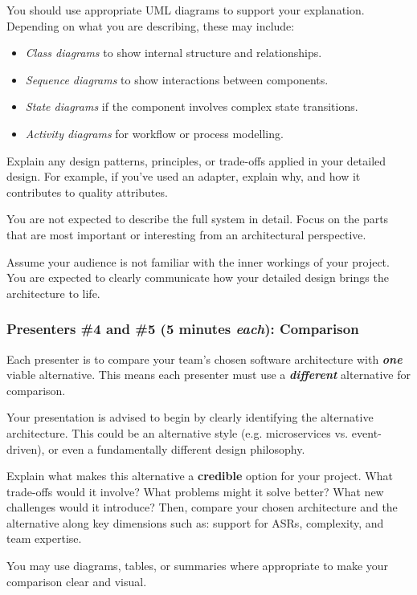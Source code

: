 \documentclass{csse4400}
\begin{document}
You should use appropriate UML diagrams to support your explanation.
Depending on what you are describing, these may include:

\begin{itemize}
    \item \emph{Class diagrams} to show internal structure and relationships.
    \item \emph{Sequence diagrams} to show interactions between components.
    \item \emph{State diagrams} if the component involves complex state transitions.
    \item \emph{Activity diagrams} for workflow or process modelling.
\end{itemize}

Explain any design patterns, principles, or trade-offs applied in your detailed design.
For example, if you've used an adapter, explain why, and how it contributes to quality attributes.

You are not expected to describe the full system in detail.
Focus on the parts that are most important or interesting from an architectural perspective.

Assume your audience is not familiar with the inner workings of your project.
You are expected to clearly communicate how your detailed design brings the architecture to life.

\subsubsection{Presenters \#4 and \#5 (5 minutes \textit{each}): Comparison}

Each presenter is to compare your team's chosen software architecture with \textbf{\textit{one}} viable alternative.
This means each presenter must use a \textbf{\textit{different}} alternative for comparison.

Your presentation is advised to begin by clearly identifying the alternative architecture.
This could be an alternative style (e.g. microservices vs. event-driven),
or even a fundamentally different design philosophy.

Explain what makes this alternative a \textbf{credible} option for your project.
What trade-offs would it involve?
What problems might it solve better?
What new challenges would it introduce?
Then, compare your chosen architecture and the alternative along key dimensions such as:
support for ASRs, complexity, and team expertise.

You may use diagrams, tables, or summaries where appropriate to make your comparison clear and visual.
\end{document}
